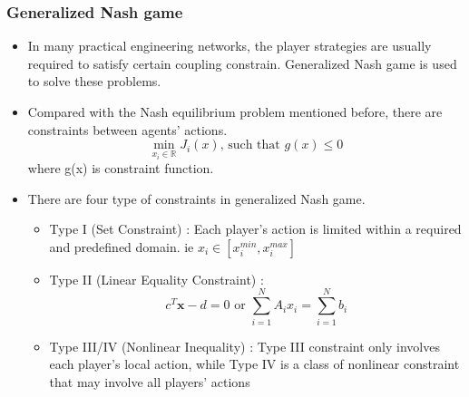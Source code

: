 \begin{frame}
  \frametitle{\normalsize{Generalized Nash game}}
  \begin{itemize}\small


      \item In many practical engineering networks, the player strategies are usually required to satisfy certain \textcolor[rgb]{0.00,0.00,1.00}{coupling constrain}. Generalized Nash game is used to solve these problems.
      \item  Compared with the Nash equilibrium problem mentioned before, there are constraints between agents' actions.
      \begin{equation}
        \min _{x_i \in \mathbb{R}} J_i(x) \text {, such that } g(x) \leq 0 \text {}
      \end{equation}
      where g(x) is constraint function.
      
      \item There are four type of constraints in generalized Nash game.
      
      \begin{itemize}
        \item Type I (Set Constraint) : Each player’s action is limited within a required and predefined domain. ie $x_i \in [x^{min}_i, x^{max}_i]$
        \item Type II (Linear Equality Constraint) : $$c^{T} \mathbf{x}-d=0 \text { or } \sum_{i=1}^{N} A_{i} x_{i}=\sum_{i=1}^{N} b_{i}$$
        \item Type III/IV (Nonlinear Inequality) : Type III constraint only involves
        each player’s local action, while Type IV is a class of nonlinear constraint that
        may involve all players’ actions
      \end{itemize}
      
  \end{itemize} 
        
\end{frame}

